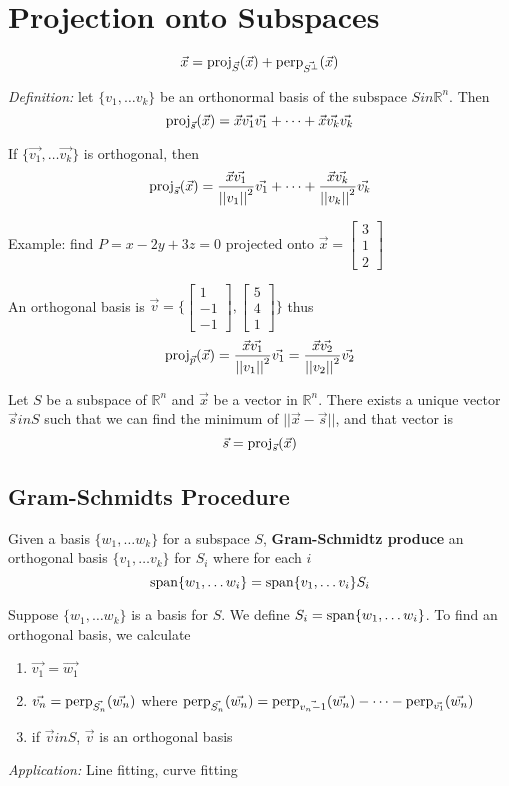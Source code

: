 \documentclass[12pt]{article}
\newcommand{\perpp}[2]{{\rm perp}_{\vec{#2}} (\vec{#1})}
\newcommand{\proj}[2]{{\rm proj}_{\vec{#2}} (\vec{#1})}
\newcommand{\R}[1]{\mathbb{R}^{#1}}
\newcommand{\spanv}[1]{{\rm span}\{#1\}}
\newcommand{\vecthree}[3]{\begin{bmatrix}#1\\#2\\#3\end{bmatrix}}
\begin{document}
\section*{Projection onto Subspaces}
\[ \vec{x} = \proj{x}{S} + \perpp{x}{S^\perp} \]

\textit{Definition:} let $\{v_1,\dots v_k\}$ be an orthonormal basis of the subspace $Sin\R{n}$. Then \[ \proj{x}{s} = \vec{x}\vec{v_1}\vec{v_1} + \dots + \vec{x}\vec{v_k}\vec{v_k} \]

If $\{\vec{v_1},\dots \vec{v_k}\}$ is orthogonal, then \[ \proj{x}{s} = \frac{\vec{x}\vec{v_1}}{{||v_1||}^2}\vec{v_1} + \dots + \frac{\vec{x}\vec{v_k}}{{||v_k||}^2}\vec{v_k} \]

Example: find $P = x -2y + 3z = 0$ projected onto $\vec{x} = \vecthree{3}{1}{2}$

An orthogonal basis is $\vec{v} = \bigg\{ \vecthree{1}{-1}{-1},\vecthree{5}{4}{1} \bigg\}$ thus \[ \proj{x}{p} = \frac{\vec{x}\vec{v_1}}{{||v_1||}^2}\vec{v_1} = \frac{\vec{x}\vec{v_2}}{{{||v_2||}}^2}\vec{v_2} \]

\begin{theorem}
Let $S$ be a subspace of $\R{n}$ and $\vec{x}$ be a vector in $\R{n}$. There exists a unique vector $\vec{s}in S$ such that we can find the minimum of $||\vec{x}-\vec{s}||$, and that vector is \[ \vec{s} = \proj{x}{s} \]
\end{theorem}

\subsection*{Gram-Schmidts Procedure}
Given a basis $\{w_1,\dots w_k\}$ for a subspace $S$, {\bf Gram-Schmidtz produce} an orthogonal basis $\{v_1,\dots v_k\}$ for $S_i$ where for each $i$ \[ \spanv{w_1,\dots w_i} = \spanv{v_1,\dots v_i}S_i \]

Suppose $\{w_1,\dots w_k\}$ is a basis for $S$. We define $S_i = \spanv{w_1,\dots w_i}$. To find an orthogonal basis, we calculate
\begin{enumerate}
\item $\vec{v_1} = \vec{w_1}$
\item $\vec{v_n} = \perpp{w_n}{S_n}$ where $\perpp{w_n}{S_n} = \perpp{w_n}{v_n-1} - \dots - \perpp{w_n}{v_1}$
\item if $\vec{v}in S$, $\vec{v}$ is an orthogonal basis
\end{enumerate}

\textit{Application:} Line fitting, curve fitting
\end{document}
